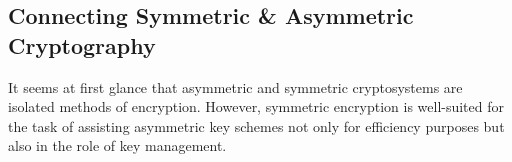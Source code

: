  
\subsection{Connecting Symmetric \& Asymmetric Cryptography}
It seems at first glance that asymmetric and symmetric cryptosystems are isolated methods of encryption. However, symmetric encryption is well-suited for the task of assisting asymmetric key schemes not only for efficiency purposes but also in the role of key management. 
